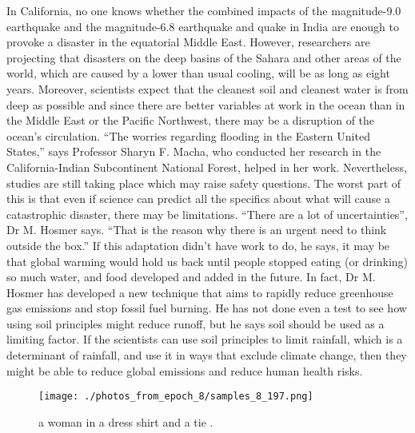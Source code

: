\documentclass{article}%
\begin{document}
In California, no one knows whether the combined impacts of the magnitude{-}9.0 earthquake and the magnitude{-}6.8 earthquake and quake in India are enough to provoke a disaster in the equatorial Middle East. However, researchers are projecting that disasters on the deep basins of the Sahara and other areas of the world, which are caused by a lower than usual cooling, will be as long as eight years. Moreover, scientists expect that the cleanest soil and cleanest water is from deep as possible and since there are better variables at work in the ocean than in the Middle East or the Pacific Northwest, there may be a disruption of the ocean’s circulation. “The worries regarding flooding in the Eastern United States,” says Professor Sharyn F. Macha, who conducted her research in the California{-}Indian Subcontinent National Forest, helped in her work.\newline%
Nevertheless, studies are still taking place which may raise safety questions.\newline%
The worst part of this is that even if science can predict all the specifics about what will cause a catastrophic disaster, there may be limitations. “There are a lot of uncertainties”, Dr M. Hosmer says. “That is the reason why there is an urgent need to think outside the box.”\newline%
If this adaptation didn’t have work to do, he says, it may be that global warming would hold us back until people stopped eating (or drinking) so much water, and food developed and added in the future. In fact, Dr M. Hosmer has developed a new technique that aims to rapidly reduce greenhouse gas emissions and stop fossil fuel burning. He has not done even a test to see how using soil principles might reduce runoff, but he says soil should be used as a limiting factor. If the scientists can use soil principles to limit rainfall, which is a determinant of rainfall, and use it in ways that exclude climate change, then they might be able to reduce global emissions and reduce human health risks.\newline%

%


\begin{figure}[h!]%
\centering%
\texttt{[image: ./photos\_from\_epoch\_8/samples\_8\_197.png]}%
\caption{a woman in a dress shirt and a tie .}%
\end{figure}

%
\end{document}
